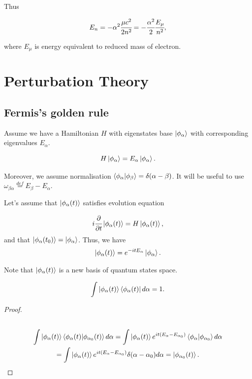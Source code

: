 \documentclass[main.tex]{subfiles}
\begin{document}
Thus

\begin{equation}
E_n = - \alpha^2 \cfrac{\mu c^2}{2 n^2} = - \cfrac{\alpha^2}{2} \cfrac{E_\mu}{n^2},
\end{equation}

where $E_\mu$ is energy equivalent to reduced mass of electron.

\section{Perturbation Theory}
\subsection{Fermis's golden rule}
\label{fermi-golden-rule}
Assume we have a Hamiltonian $H$ with eigenstates base $\ket{\phi_\alpha}$ with corresponding eigenvalues $E_\alpha$. 

\begin{equation}
H \ket{\phi_\alpha} = E_{\alpha} \ket{\phi_\alpha}.
\end{equation}

Moreover, we assume normalisation $\bra{\phi_\alpha}\ket{\phi_\beta} = \delta(\alpha - \beta)$. It will be useful to use $\omega_{\beta\alpha} \stackrel{def}{=} E_\beta - E_\alpha$.


Let's assume that $\ket{\phi_\alpha(t)}$ satisfies evolution equation

\begin{equation}
i\cfrac{\partial}{\partial t} \ket{\phi_\alpha(t)} = H\ket{\phi_\alpha(t)},
\end{equation}
and that $\ket{\phi_\alpha(t_0)} = \ket{\phi_\alpha}$. Thus, we have
\begin{equation}
\ket{\phi_\alpha(t)} = e^{-itE_\alpha} \ket{\phi_\alpha}.
\end{equation}

Note that $\ket{\phi_\alpha(t)}$ is a new basis of quantum states space.
\begin{proposition}
\label{timed-unity-decomposition}
\begin{equation}
\int \ket{\phi_\alpha(t)}\bra{\phi_\alpha(t)} d\alpha = 1.
\end{equation}
\end{proposition}
\begin{proof}
\begin{multline*}\\
\int \ket{\phi_\alpha(t)}\bra{\phi_\alpha(t)}\ket{\phi_{\alpha_0}(t)} d\alpha = 
\int \ket{\phi_\alpha(t)} e^{it(E_\alpha - E_{\alpha_0})}\bra{\phi_\alpha}\ket{\phi_{\alpha_0}} d\alpha\\
= \int \ket{\phi_\alpha(t)} e^{it(E_\alpha - E_{\alpha_0})} \delta(\alpha - \alpha_0) d\alpha = \ket{\phi_{\alpha_0}(t)}.\\
\end{multline*}
\end{proof}
\end{document}
